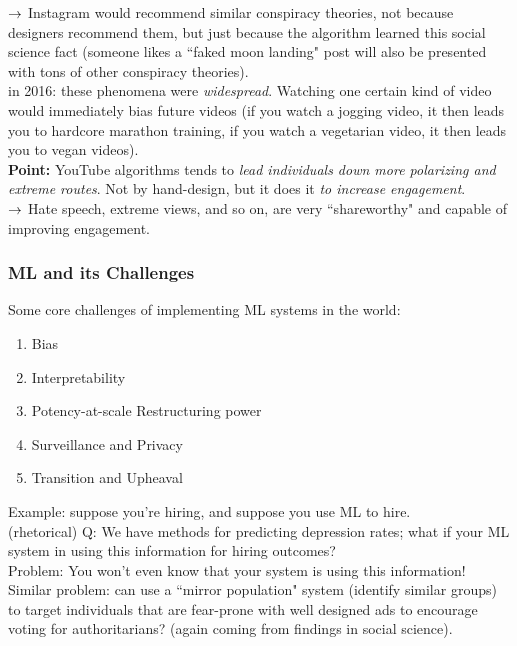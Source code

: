 $\rightarrow$ Instagram would recommend similar conspiracy theories, not because designers recommend them, but just because the algorithm learned this social science fact (someone likes a ``faked moon landing" post will also be presented with tons of other conspiracy theories). \\

in 2016: these phenomena were {\it widespread}. Watching one certain kind of video would immediately bias future videos (if you watch a jogging video, it then leads you to hardcore marathon training, if you watch a vegetarian video, it then leads you to vegan videos). \\

{\bf Point:} YouTube algorithms tends to {\it lead individuals down more polarizing and extreme routes}. Not by hand-design, but it does it {\it to increase engagement}. \\

$\rightarrow$ Hate speech, extreme views, and so on, are very ``shareworthy" and capable of improving engagement.

\subsubsection{ML and its Challenges}

Some core challenges of implementing ML systems in the world:
\begin{enumerate}
    \item Bias
    \item Interpretability
    \item Potency-at-scale Restructuring power
    \item Surveillance and Privacy
    \item Transition and Upheaval
\end{enumerate}

Example: suppose you're hiring, and suppose you use ML to hire. \\

(rhetorical) Q: We have methods for predicting depression rates; what if your ML system in using this information for hiring outcomes? \\

Problem: You won't even know that your system is using this information! \\

Similar problem: can use a ``mirror population" system (identify similar groups) to target individuals that are fear-prone with well designed ads to encourage voting for authoritarians? (again coming from findings in social science). \\

